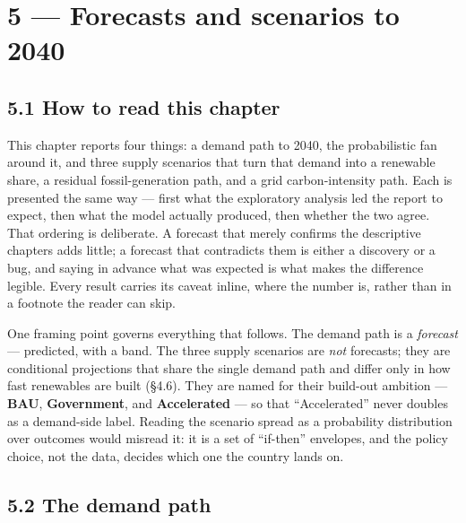 \documentclass[10pt,twocolumn]{article}
\begin{document}
\section*{5 --- Forecasts and scenarios to 2040}

\subsection*{5.1 How to read this chapter}

This chapter reports four things: a demand path to 2040, the probabilistic fan around it, and three supply scenarios that turn that demand into a renewable share, a residual fossil-generation path, and a grid carbon-intensity path. Each is presented the same way --- first what the exploratory analysis led the report to expect, then what the model actually produced, then whether the two agree. That ordering is deliberate. A forecast that merely confirms the descriptive chapters adds little; a forecast that contradicts them is either a discovery or a bug, and saying in advance what was expected is what makes the difference legible. Every result carries its caveat inline, where the number is, rather than in a footnote the reader can skip.

One framing point governs everything that follows. The demand path is a \textit{forecast} --- predicted, with a band. The three supply scenarios are \textit{not} forecasts; they are conditional projections that share the single demand path and differ only in how fast renewables are built (\S{}4.6). They are named for their build-out ambition --- \textbf{BAU}, \textbf{Government}, and \textbf{Accelerated} --- so that ``Accelerated'' never doubles as a demand-side label. Reading the scenario spread as a probability distribution over outcomes would misread it: it is a set of ``if-then'' envelopes, and the policy choice, not the data, decides which one the country lands on.

\subsection*{5.2 The demand path}
\end{document}
